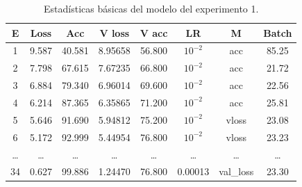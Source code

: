     \begin{table}[ht]
      \small
      \begin{center}
          \begin{tabular}{|c|c|c|c|c|c|c|c|} \hline
          E & Loss & Acc & V loss & V acc & LR & M & Batch \\ \hline
          1 & 9.587 & 40.581 & 8.95658 & 56.800 & $10^{-2}$ & acc & 85.25 \\ \hline
          2 & 7.798 & 67.615 & 7.67235 & 66.800 & $10^{-2}$ & acc & 21.72 \\ \hline
          3 & 6.884 & 79.340 & 6.96014 & 69.600 & $10^{-2}$ & acc & 22.56 \\ \hline
          4 & 6.214 & 87.365 & 6.35865 & 71.200 & $10^{-2}$ & acc & 25.81 \\ \hline
          5 & 5.646 & 91.690 & 5.94812 & 75.200 & $10^{-2}$ & vloss & 23.08 \\ \hline
          6 & 5.172 & 92.999 & 5.44954 & 76.800 & $10^{-2}$ & vloss & 23.23 \\ \hline
          \dots & \dots & \dots & \dots & \dots & \dots & \dots & \dots \\ \hline
          34 & 0.627 & 99.886 & 1.24470 & 76.800 & 0.00013 & val\_loss & 23.30 \\ \hline
          \end{tabular}
          \caption{Estadísticas básicas del modelo del experimento 1.}
      \end{center}\label{fig:estadisticas_p1}
  \end{table}

